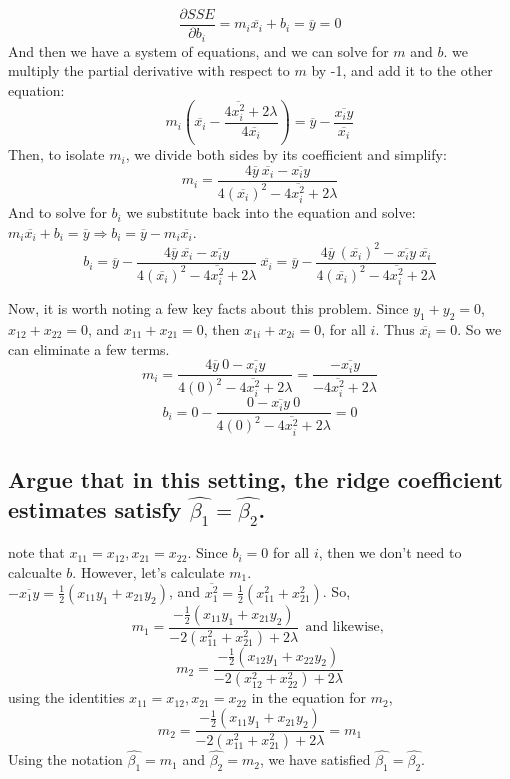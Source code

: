 \documentclass[20pt]{article} %
\begin{document}
$$\frac{\partial SSE}{\partial b_i} = m_i \overline{x_i} + b_i = \overline{y} = 0$$
\newpage
And then we have a system of equations, and we can solve for $m$ and $b$. we multiply the partial derivative with respect to $m$ by -1, and add it to the other equation:
$$m_i ( \overline{x_i} - \frac{4 \overline{x_i^{2}} + 2 \lambda}{4 \overline{x_i}}) = \overline{y} - \frac{\overline{x_i y}}{\overline{x_i}}$$
Then, to isolate $m_i$, we divide both sides by its coefficient and simplify:
$$m_i = \frac{4 \overline{y} \ \overline{x_i} - \overline{x_i y}}{4( \overline{x_i} )^{2} - 4 \overline{x_i^{2}} + 2 \lambda}$$
And to solve for $b_i$ we substitute back into the equation and solve: $m_i \overline{x_i} + b_i = \overline{y} \Rightarrow b_i = \overline{y} - m_i \overline{x_i}$.
$$b_i = \overline{y} - \frac{4 \overline{y} \ \overline{x_i} - \overline{x_i y}}{4( \overline{x_i} )^{2} - 4 \overline{x_i^{2}} + 2 \lambda} \ \overline{x_i} 
= \overline{y} - \frac{4 \overline{y} \ (\overline{x_i})^{2} - \overline{x_i y} \ \overline{x_i}}{4( \overline{x_i} )^{2} - 4 \overline{x_i^{2}} + 2 \lambda}$$

Now, it is worth noting a few key facts about this problem. Since $y_1 + y_2 = 0$, $x_{12}+x_{22}=0$, and $x_{11} + x_{21} = 0$, then $x_{1i} + x_{2i} = 0$, for all $i$. Thus $\overline{x_i} = 0$. So we can eliminate a few terms.
$$m_i = \frac{4 \overline{y} \ 0 - \overline{x_i y}}{4( 0 )^{2} - 4 \overline{x_i^{2}} + 2 \lambda} = \frac{- \overline{x_i y}}{ - 4 \overline{x_i^{2}} + 2 \lambda}$$
$$b_i = 0 - \frac{0 - \overline{x_i y} \ 0}{4( 0 )^{2} - 4 \overline{x_i^{2}} + 2 \lambda} = 0$$



\subsection{Argue that in this setting, the ridge coefficient estimates satisfy $\hat{\beta_1} = \hat{\beta_2}$.}
note that $x_{11} = x_{12}, x_{21} =x_{22}$. Since $b_i = 0$ for all $i$, then we don't need to calcualte $b$. However, let's calculate $m_1$. \\
$- \overline{x_1 y} = \frac{1}{2}(x_{11}y_1 + x_{21}y_2)$, and $\overline{x_1^{2}} = \frac{1}{2}(x_{11}^{2} + x_{21}^{2})$. So,
$$m_1 = \frac{-\frac{1}{2}(x_{11}y_1 + x_{21}y_2)}{-2 (x_{11}^{2} + x_{21}^{2}) + 2 \lambda} \ \ \text{and likewise, }$$
$$m_2 = \frac{-\frac{1}{2}(x_{12}y_1 + x_{22}y_2)}{-2 (x_{12}^{2} + x_{22}^{2}) + 2 \lambda}$$
using the identities $x_{11} = x_{12}, x_{21} =x_{22}$ in the equation for $m_2$,
$$m_2 = \frac{-\frac{1}{2}(x_{11}y_1 + x_{21}y_2)}{-2 (x_{11}^{2} + x_{21}^{2}) + 2 \lambda} = m_1$$
Using the notation $\hat{\beta_1} = m_1$ and $\hat{\beta_2} = m_2$, we have satisfied $\hat{\beta_1} = \hat{\beta_2}$.
\end{document}
